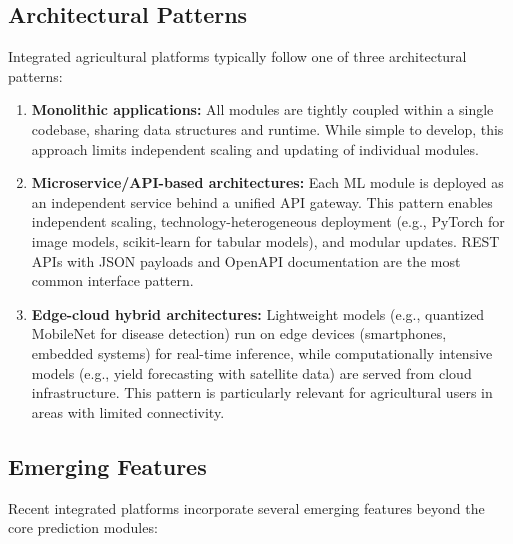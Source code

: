 \documentclass[journal]{IEEEtran}
\begin{document}
\subsection{Architectural Patterns}

Integrated agricultural platforms typically follow one of three architectural patterns:

\begin{enumerate}[leftmargin=*]
  \item \textbf{Monolithic applications:} All modules are tightly coupled within a single codebase, sharing data structures and runtime. While simple to develop, this approach limits independent scaling and updating of individual modules.
  
  \item \textbf{Microservice/API-based architectures:} Each ML module is deployed as an independent service behind a unified API gateway. This pattern enables independent scaling, technology-heterogeneous deployment (e.g., PyTorch for image models, scikit-learn for tabular models), and modular updates. REST APIs with JSON payloads and OpenAPI documentation are the most common interface pattern.
  
  \item \textbf{Edge-cloud hybrid architectures:} Lightweight models (e.g., quantized MobileNet for disease detection) run on edge devices (smartphones, embedded systems) for real-time inference, while computationally intensive models (e.g., yield forecasting with satellite data) are served from cloud infrastructure. This pattern is particularly relevant for agricultural users in areas with limited connectivity.
\end{enumerate}

\subsection{Emerging Features}

Recent integrated platforms incorporate several emerging features beyond the core prediction modules:
\end{document}
